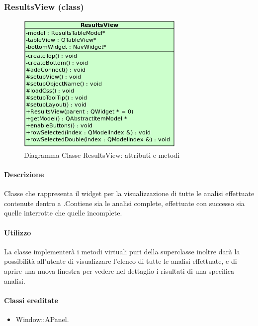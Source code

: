 \subsubsection{ResultsView (class)}
\label{speResV}
\begin{figure}[!h]
\centering
			\includegraphics[width=0.45\linewidth]{./Content/Immagini/view/ResultsView.png}
			\caption{Diagramma Classe ResultsView: attributi e metodi}
			\label{cl_ResV}
\end{figure}
\paragraph{Descrizione \\}
Classe che rappresenta il widget per la visualizzazione di tutte le analisi effettuate contenute dentro a \project{}.Contiene sia le analisi complete, effettuate con successo sia quelle interrotte che quelle incomplete.
\paragraph{Utilizzo\\}
La classe implementerà i metodi virtuali puri della superclasse inoltre darà la possibilità all'utente di visualizzare l'elenco di tutte le analisi effettuate, e di aprire una nuova finestra per vedere nel dettaglio i risultati di una specifica analisi.
\paragraph{Classi ereditate\\}
\begin{itemize}
\item Window::APanel.
\end{itemize}
